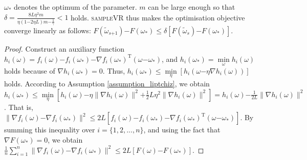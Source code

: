 \documentclass[letterpaper]{article}
\begin{document}
\begin{Theorem}
\label{Theorem_converge}
$\omega_\ast$ denotes the optimum of the parameter.  $m$ can be large enough so that $\delta = \frac{8 L \eta^2 m}{ \eta(1\mathrm{-}2\eta L) m  \mathrm{-}  \frac{1}{\gamma}    }     <1$ holds. \textsc{sampleVR} thus makes the optimisation objective converge linearly as follows:
$F(\tilde{\omega}_{s\mathrm{+}1}) \mathrm{-} F(\omega_\ast)  \le \delta [F(\tilde{\omega}_s)\mathrm{-}F(\omega_\ast)]$.
\end{Theorem}
\begin{proof}
Construct an auxiliary function $h_i(\omega)=f_i(\omega)\mathrm{-}f_i(\omega_\ast)\mathrm{-}\nabla f_i(\omega_\ast)^\mathrm{T}(\omega\mathrm{-}\omega_\ast)$, and $h_i(\omega_\ast)=\min\limits_\omega h_i(\omega)$ holds because of $\nabla h_i(\omega_\ast)=0$. Thus, $h_i(\omega_\ast)\le \min\limits_\eta [h_i(\omega\mathrm{-}\eta \nabla h_i(\omega))]$ holds. According to Assumption \ref{assumption_liptchiz}, we obtain
$h_i(\omega_\ast)\le\min\limits_\eta [h_i(\omega)\mathrm{-}\eta \parallel \nabla h_i(\omega) \parallel^2\mathrm{+}\frac{1}{2} L \eta^2 \parallel  \nabla h_i(\omega)  \parallel^2  ] 
=h_i(\omega)\mathrm{-}\frac{1}{2L}\parallel  \nabla h_i(\omega) \parallel^2$.  That is, 
$\parallel   \nabla f_i(\omega)  \mathrm{-} \nabla f_i(\omega_\ast)   \parallel^2 \le 2L [ f_i(\omega)  \mathrm{-}  f_i(\omega_\ast)  \mathrm{-}\nabla f_i(\omega_\ast)^{\mathrm{T}}(\omega\mathrm{-}\omega_\ast)  ]$. By summing this inequality over $i=\{1,2, ..., n\}$, and using the fact that $\nabla F(\omega_\ast)=0$, we obtain $
\frac{1}{n} \sum\limits_{i=1}^n \parallel  \nabla f_i(\omega)  \mathrm{-} \nabla f_i(\omega_\ast)  \parallel^2  \mathrm{\le}   2L [F(\omega)\mathrm{-}F(\omega_\ast)] $.


\end{proof}
\end{document}

